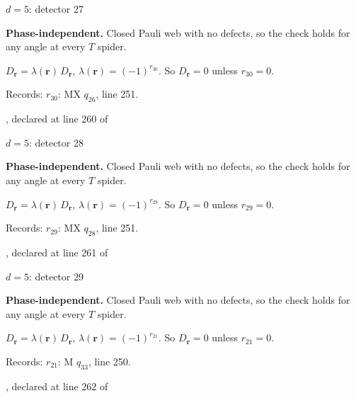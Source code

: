 \label{d5_det027}
{\Large $d=5$: detector 27}\par
\textbf{Phase-independent.} Closed Pauli web with no defects, so the check holds for any angle at every $T$ spider.
\begin{center}
\end{center}
\vspace{-1mm}
$D_{\boldsymbol r}=\lambda(\boldsymbol r)\,D_{\boldsymbol r}$, \quad $\lambda(\boldsymbol r)=(-1)^{r_{30}}$. \qquad So $D_{\boldsymbol r}=0$ unless $r_{30}=0$.
\par\smallskip\begin{minipage}{.98\linewidth}\small Records: $r_{30}$: MX $q_{26}$, line 251.\end{minipage}
\vfill
{\footnotesize\texttt{}, declared at line 260 of \texttt{}}
\newpage

\label{d5_det028}
{\Large $d=5$: detector 28}\par
\textbf{Phase-independent.} Closed Pauli web with no defects, so the check holds for any angle at every $T$ spider.
\begin{center}
\end{center}
\vspace{-1mm}
$D_{\boldsymbol r}=\lambda(\boldsymbol r)\,D_{\boldsymbol r}$, \quad $\lambda(\boldsymbol r)=(-1)^{r_{29}}$. \qquad So $D_{\boldsymbol r}=0$ unless $r_{29}=0$.
\par\smallskip\begin{minipage}{.98\linewidth}\small Records: $r_{29}$: MX $q_{28}$, line 251.\end{minipage}
\vfill
{\footnotesize\texttt{}, declared at line 261 of \texttt{}}
\newpage

\label{d5_det029}
{\Large $d=5$: detector 29}\par
\textbf{Phase-independent.} Closed Pauli web with no defects, so the check holds for any angle at every $T$ spider.
\begin{center}
\end{center}
\vspace{-1mm}
$D_{\boldsymbol r}=\lambda(\boldsymbol r)\,D_{\boldsymbol r}$, \quad $\lambda(\boldsymbol r)=(-1)^{r_{21}}$. \qquad So $D_{\boldsymbol r}=0$ unless $r_{21}=0$.
\par\smallskip\begin{minipage}{.98\linewidth}\small Records: $r_{21}$: M $q_{33}$, line 250.\end{minipage}
\vfill
{\footnotesize\texttt{}, declared at line 262 of \texttt{}}
\newpage

